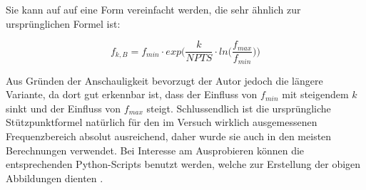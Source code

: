 {\begin{minipage}[t]{.265\textwidth}
        Sie kann auf auf eine Form  vereinfacht werden, die sehr \"ahnlich zur
        urspr\"unglichen Formel ist:

        \begin{equation*}
            f_{k,B} = f_{min} \cdot exp\Biggl(\frac{k}{NPTS} \cdot ln\biggl(\frac{f_{max}}{f_{min}}\biggr) \Biggr)
        \end{equation*}

    \end{minipage}%
    \begin{minipage}[t]{.3675\textwidth}
        \vspace{0em}
        \resizebox{\textwidth}{!}{}
        \label{fig:stuetzpunkte:high}
    \end{minipage}%
    \begin{minipage}[t]{.3675\textwidth}
        \vspace{0em}
        \resizebox{\textwidth}{!}{}
        \label{fig:stuetzpunkte:low}
    \end{minipage}

    \vspace{0.3em}
    \begin{minipage}[t]{\textwidth}
    Aus Gr\"unden der Anschauligkeit bevorzugt  der Autor jedoch die l\"angere
    Variante,  da dort  gut erkennbar  ist,  dass der  Einfluss von  $f_{min}$
    mit  steigendem  $k$   sinkt  und  der  Einfluss   von  $f_{max}$  steigt.
    Schlussendlich  ist  die  urspr\"ungliche  St\"utzpunktformel  nat\"urlich
    f\"ur  den  im  Versuch  wirklich  ausgemessenen  Frequenzbereich  absolut
    ausreichend, daher wurde  sie auch in den  meisten Berechnungen verwendet.
    Bei Interesse  am Ausprobieren k\"onnen die  entsprechenden Python-Scripts
    benutzt  werden,  welche zur  Erstellung  der  obigen Abbildungen  dienten
    \cite{ref:aw:github}.
    \end{minipage}


\clearpage
} %


